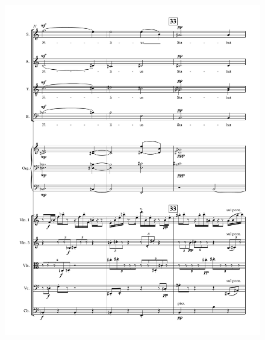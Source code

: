 \begin{figure}[htbp]
    \centering
	\includegraphics[width=6.5in]{figures/Stabat_Mater_7.pdf}
\end{figure}


